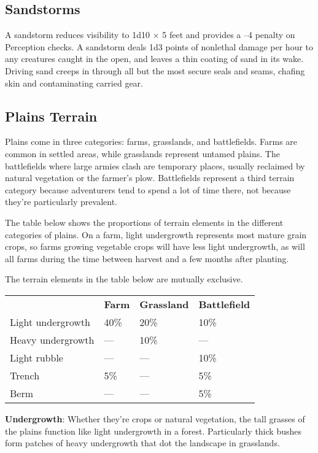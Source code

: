 \subsection{Sandstorms}

				
A sandstorm reduces visibility to 1d10 \mbox{$\times$} 5 feet and provides a --4 penalty on Perception checks. A sandstorm deals 1d3 points of nonlethal damage per hour to any creatures caught in the open, and leaves a thin coating of sand in its wake. Driving sand creeps in through all but the most secure seals and seams, chafing skin and contaminating carried gear. 
				
\subsection{Plains Terrain}

				
Plains come in three categories: farms, grasslands, and battlefields. Farms are common in settled areas, while grasslands represent untamed plains. The battlefields where large armies clash are temporary places, usually reclaimed by natural vegetation or the farmer's plow. Battlefields represent a third terrain category because adventurers tend to spend a lot of time there, not because they're particularly prevalent.
				
The table below shows the proportions of terrain elements in the different categories of plains. On a farm, light undergrowth represents most mature grain crops, so farms growing vegetable crops will have less light undergrowth, as will all farms during the time between harvest and a few months after planting.
				
The terrain elements in the table below are mutually exclusive.
				

\begin{tabular}{llll}
 & \textbf{Farm} & \textbf{Grassland} & \textbf{Battlefield}\\
Light undergrowth & 40\% & 20\% & 10\%\\
Heavy undergrowth & --- & 10\% & ---\\
Light rubble & --- &--- & 10\%\\
Trench & 5\% & --- & 5\%\\
Berm & --- & --- & 5\%\\
\end{tabular}
				
\textbf{Undergrowth}: Whether they're crops or natural vegetation, the tall grasses of the plains function like light undergrowth in a forest. Particularly thick bushes form patches of heavy undergrowth that dot the landscape in grasslands.
				
